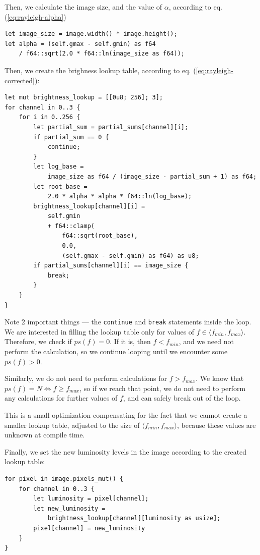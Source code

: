 \documentclass[12pt]{article}
\begin{document}
\pagebreak[2]
Then, we calculate the image size, and the value of $\alpha$, according to eq. (\ref{eq:rayleigh-alpha})
\begin{lstlisting}
let image_size = image.width() * image.height();
let alpha = (self.gmax - self.gmin) as f64 
    / f64::sqrt(2.0 * f64::ln(image_size as f64));
\end{lstlisting}

\pagebreak[2]
Then, we create the brighness lookup table, according to eq. (\ref{eq:rayleigh-corrected}):
\begin{lstlisting}[basicstyle = \footnotesize\ttfamily]
let mut brightness_lookup = [[0u8; 256]; 3];
for channel in 0..3 {
    for i in 0..256 {
        let partial_sum = partial_sums[channel][i];
        if partial_sum == 0 {
            continue;
        }
        let log_base = 
            image_size as f64 / (image_size - partial_sum + 1) as f64;
        let root_base = 
            2.0 * alpha * alpha * f64::ln(log_base);
        brightness_lookup[channel][i] = 
            self.gmin
            + f64::clamp(
                f64::sqrt(root_base), 
                0.0, 
                (self.gmax - self.gmin) as f64) as u8;
        if partial_sums[channel][i] == image_size {
            break;
        }
    }
}
\end{lstlisting}

Note 2 important things --- the \lstinline{continue} and \lstinline{break} statements inside the loop.
We are interested in filling the lookup table only for values of $f \in \langle f_{min}, f_{max} \rangle$.
Therefore, we check if $ps(f) = 0$. If it is, then $f < f_{min}$, and we need not perform the calculation, so we continue looping
until we encounter some $ps(f) > 0$.

Similarly, we do not need to perform calculations for $f > f_{max}$. We know that $ps(f) = N \Leftrightarrow f \geq f_{max}$,
so if we reach that point, we do not need to perform any calculations for further values of $f$, and can safely break out of the loop.

This is a small optimization compensating for the fact that we cannot create a smaller lookup table, adjusted to the size of $\langle f_{min}, f_{max}\rangle$, because these values are unknown at compile time.

\pagebreak[2]
Finally, we set the new luminosity levels in the image according to the created lookup table:
\begin{lstlisting}
for pixel in image.pixels_mut() {
    for channel in 0..3 {
        let luminosity = pixel[channel];
        let new_luminosity = 
            brightness_lookup[channel][luminosity as usize];
        pixel[channel] = new_luminosity
    }
}
\end{lstlisting}
\end{document}
